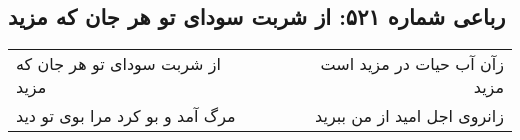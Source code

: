 \begin{center}
\section*{رباعی شماره ۵۲۱: از شربت سودای تو هر جان که مزید}
\label{sec:0521}
\begin{longtable}{l p{0.5cm} r}
از شربت سودای تو هر جان که مزید
&&
زآن آب حیات در مزید است مزید
\\
مرگ آمد و بو کرد مرا بوی تو دید
&&
زانروی اجل امید از من ببرید
\\
\end{longtable}
\end{center}
